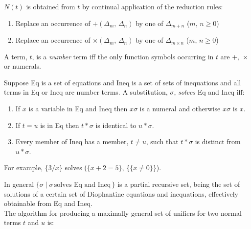 \documentclass[letterpaper]{report}
\begin{document}
$N(t)$ is obtained from $t$ by continual application of the
reduction rules:

\begin{enumerate}
	\def\labelenumi{(\arabic{enumi})}
	\item
	Replace an occurrence of $+(\Delta_{m},\,\Delta_{n})$ by one of
	$\Delta_{m+n}$ \quad($m,\,n \geqslant 0$)
	\item
	Replace an occurrence of $\times(\Delta_{m},\,\Delta_{n})$ by one of
	$\Delta_{m\times n}$ \quad($m,\,n \geqslant 0$)
\end{enumerate}

A term, $t$, is a \emph{number} term iff the only function symbols
occurring in $t$ are $+,\,\times$ or numerals.

Suppose Eq is a set of equations and Ineq is a set of sets of
inequations and all terms in Eq or Ineq are number terms. A
substitution, $\sigma$, \emph{solves} Eq and Ineq iff:

\begin{enumerate}
	\def\labelenumi{(\arabic{enumi})}
	\item
	If $x$ is a variable in Eq and Ineq then $x\sigma$ is a numeral
	and otherwise $x\sigma$ is $x$.
	\item
	If $t = u$ is in Eq then $t*\sigma$ is identical to $u*\sigma$.
	\item
	Every member of Ineq has a member, $t \neq u$, such that
	$t*\sigma$ is distinct from $u*\sigma$.
\end{enumerate}

For example, $\{3/x\}$ solves ($\{x + 2 = 5\}$,
$\{\{x \neq 0\}\}$).

In general $\{\sigma\mid \sigma\,\mbox{solves Eq and Ineq}\,\}$ is a
partial recursive set, being the set of solutions of a certain set of
Diophantine equations and inequations, effectively obtainable from Eq
and Ineq.\\
The algorithm for producing a maximally general set of unifiers for two
normal terms $t$ and $u$ is:
\end{document}
